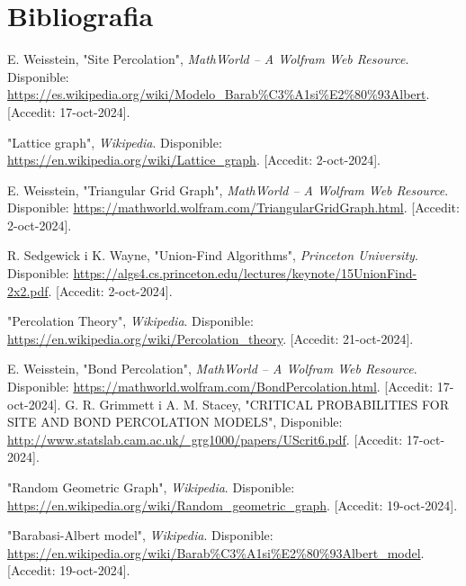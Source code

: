 \documentclass[a4paper]{article}
\begin{document}
	\newpage
	\section{Bibliografia}
	
	\renewcommand{\refname}{}	
	\begin{thebibliography}{99}
		\vspace{-2em}
		
		 E. Weisstein, "Site Percolation", \textit{MathWorld -- A Wolfram Web Resource}. Disponible: \href{https://es.wikipedia.org/wiki/Modelo_Barab%C3%A1si%E2%80%93Albert}{https://es.wikipedia.org/wiki/Modelo\_Barab\%C3\%A1si\%E2\%80\%93Albert}. [Accedit: 17-oct-2024].
		
		 "Lattice graph", \textit{Wikipedia}. Disponible: \href{https://en.wikipedia.org/wiki/Lattice_graph}{https://en.wikipedia.org/wiki/Lattice\_graph}. [Accedit: 2-oct-2024].
		
		 E. Weisstein, "Triangular Grid Graph", \textit{MathWorld -- A Wolfram Web Resource}. Disponible: \href{https://mathworld.wolfram.com/TriangularGridGraph.html}{https://mathworld.wolfram.com/TriangularGridGraph.html}. [Accedit: 2-oct-2024].
		
		 R. Sedgewick i K. Wayne, "Union-Find Algorithms", \textit{Princeton University}. Disponible: \href{https://algs4.cs.princeton.edu/lectures/keynote/15UnionFind-2x2.pdf}{https://algs4.cs.princeton.edu/lectures/keynote/15UnionFind-2x2.pdf}. [Accedit: 2-oct-2024].
		
		 "Percolation Theory", \textit{Wikipedia}. Disponible: \href{https://en.wikipedia.org/wiki/Percolation_theory}{https://en.wikipedia.org/wiki/Percolation\_theory}. [Accedit: 21-oct-2024].
		
		
		 E. Weisstein, "Bond Percolation", \textit{MathWorld -- A Wolfram Web Resource}. Disponible: \href{https://mathworld.wolfram.com/BondPercolation.html}{https://mathworld.wolfram.com/BondPercolation.html}. [Accedit: 17-oct-2024].
		 G. R. Grimmett i A. M. Stacey, "CRITICAL PROBABILITIES FOR SITE
		AND BOND PERCOLATION MODELS", Disponible: \href{http://www.statslab.cam.ac.uk/~grg1000/papers/UScrit6.pdf}{http://www.statslab.cam.ac.uk/~grg1000/papers/UScrit6.pdf}. [Accedit: 17-oct-2024].
		
		 "Random Geometric Graph", \textit{Wikipedia}. Disponible: \href{https://en.wikipedia.org/wiki/Random\_geometric\_graph}{https://en.wikipedia.org/wiki/Random\_geometric\_graph}. [Accedit: 19-oct-2024].

		 "Barabasi-Albert model", \textit{Wikipedia}. Disponible: \href{https://en.wikipedia.org/wiki/Barab\%C3\%A1si\%E2\%80\%93Albert\_model}{https://en.wikipedia.org/wiki/Barab\%C3\%A1si\%E2\%80\%93Albert\_model}. [Accedit: 19-oct-2024].

	\end{thebibliography}
	
\end{document}
